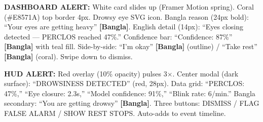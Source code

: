 \documentclass[sigconf]{acmart}
\begin{document}
\begin{promptbox}
\textbf{DASHBOARD ALERT:} White card slides up (Framer Motion spring). Coral (\#E8571A) top border 4px. Drowsy eye SVG icon. Bangla reason (24px bold): ``Your eyes are getting heavy'' \textbf{[Bangla]}. English detail (14px): ``Eyes closing detected --- PERCLOS reached 47\%.'' Confidence bar: ``Confidence: 87\%'' \textbf{[Bangla]} with teal fill. Side-by-side: ``I'm okay'' \textbf{[Bangla]} (outline) / ``Take rest'' \textbf{[Bangla]} (coral). Swipe down to dismiss.
 
\textbf{HUD ALERT:} Red overlay (10\% opacity) pulses 3$\times$. Center modal (dark surface): ``DROWSINESS DETECTED'' (red, 28px). Data grid: ``PERCLOS: 47\%,'' ``Eye closure: 2.3s,'' ``Model confidence: 91\%,'' ``Blink rate: 6/min.'' Bangla secondary: ``You are getting drowsy'' \textbf{[Bangla]}. Three buttons: DISMISS / FLAG FALSE ALARM / SHOW REST STOPS. Auto-adds to event timeline.
\end{promptbox}
 
\end{document}
